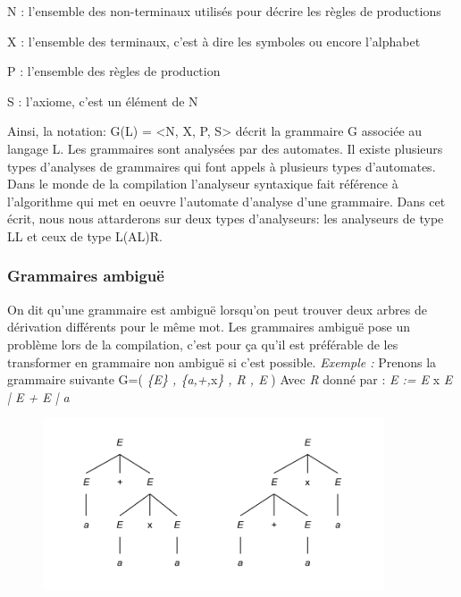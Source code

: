\documentclass{article}
\begin{document}
    N : l’ensemble des non-terminaux utilisés pour décrire les règles de productions

    X : l’ensemble des terminaux, c’est à dire les symboles ou encore l’alphabet

    P : l’ensemble des règles de production

    S : l’axiome, c’est un élément de N
\newline

Ainsi, la notation: G(L) = <N, X, P, S> décrit la grammaire G associée au langage L.
Les grammaires sont analysées par des automates. Il existe plusieurs types d’analyses de grammaires qui font appels à plusieurs types d’automates.
Dans le monde de la compilation l’analyseur syntaxique fait référence à l’algorithme qui met en oeuvre l’automate d’analyse d’une grammaire.
Dans cet écrit, nous nous attarderons sur deux types d’analyseurs: les analyseurs de type LL et ceux de type L(AL)R.

\subsubsection{Grammaires ambiguë}
On dit qu’une grammaire est ambiguë  lorsqu’on peut trouver deux arbres de dérivation différents pour le même mot.
Les grammaires ambiguë pose un problème lors de la compilation, c’est pour ça qu’il est préférable de les transformer en grammaire non ambiguë si c’est possible.\newline
\textit{Exemple : }\newline\newline
Prenons la grammaire suivante G=( \textit{\{E\} , \{a,+,}x\textit{\} , R , E} ) \newline
Avec \textit{R} donné par : \textit{E := E} x \textit{E | E + E | a}


\begin{figure}[h]
	\centering
		\includegraphics[width=0.90\textwidth]{grammaireAmbigue.png}
	\label{fig:grammaireAmbigue}
\end{figure}\FloatBarrier
\end{document}
